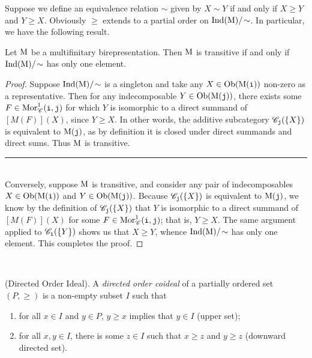 \noindent Suppose we define an equivalence relation $\sim$ given by $X \sim Y$ if and only if $X \geq Y$ and $Y \geq X$. Obviously $\geq$ extends to a partial order on $\textup{Ind}(\textup{M})/\!\sim$. In particular, we have the following result.\newpage

\noindent\begin{proposition}\label{Transitive2} Let $\textup{M}$ be a multifinitary birepresentation. Then $\textup{M}$ is transitive if and only if\linebreak $\textup{Ind}(\textup{M})/\!\sim$ has only one element.\\
\end{proposition}

\noindent\begin{proof} Suppose $\textup{Ind}(\textup{M})/\!\sim$ is a singleton and take any $X \in \textup{Ob}(\textup{M}(\textup{\texttt{i}}))$ non-zero as a representative. Then for any indecomposable $Y \in \textup{Ob}(\textup{M}(\textup{\texttt{j}}))$, there exists some $F \in \textup{Mor}_\mathscr{C}^1(\textup{\texttt{i}}, \textup{\texttt{j}})$ for which $Y$ is isomorphic to a direct summand of $[M(F)](X)$, since $Y \geq X$. In other words, the additive subcategory $\mathscr{C}_{\textup{\texttt{j}}}(\{X\})$ is equivalent to $\textup{M}(\textup{\texttt{j}})$, as by definition it is closed under direct summands and direct sums. Thus $\textup{M}$ is transitive.\\[-1.5\baselineskip]
\begin{center}
\rule{0.5\linewidth}{1pt}
\end{center}
\noindent\\[-\baselineskip]
\noindent Conversely, suppose $\textup{M}$ is transitive, and consider any pair of indecomposables $X \in \textup{Ob}(\textup{M}(\textup{\texttt{i}}))$ and $Y \in \textup{Ob}(\textup{M}(\textup{\texttt{j}}))$. Because $\mathscr{C}_{\textup{\texttt{j}}}(\{X\})$ is equivalent to $\textup{M}(\textup{\texttt{j}})$, we know by the definition of $\mathscr{C}_{\textup{\texttt{j}}}(\{X\})$ that $Y$ is isomorphic to a direct summand of $[M(F)](X)$ for some $F \in \textup{Mor}_\mathscr{C}^1(\textup{\texttt{i}}, \textup{\texttt{j}})$; that is, $Y \geq X$. The same argument applied to $\mathscr{C}_{\textup{\texttt{i}}}(\{Y\})$ shows us that $X \geq Y$, whence $\textup{Ind}(\textup{M})/\!\sim$ has only one element. This completes the proof.
\end{proof}\\

\noindent\begin{definition}\textup{(Directed Order Ideal).} A {\em directed order coideal} of a partially ordered set $(P, \geq)$ is a non-empty subset $I$ such that
\begin{enumerate}[label=$\bullet$, leftmargin=4\parindent]
\item for all $x \in I$ and $y \in P$, $y \geq x$ implies that $y \in I$ (upper set);
\item for all $x, y \in I$, there is some $z \in I$ such that $x \geq z$ and $y \geq z$ (downward directed set).\\
\end{enumerate}
\end{definition}

